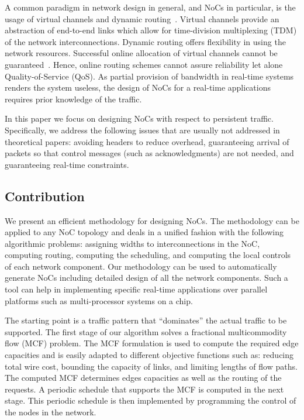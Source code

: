 \documentclass[a4paper,12pt]{article}
\newenvironment{proof sketch}[1]{\noindent {\emph{Proof sketch of #1:}}}{\hfill \qed}
\begin{document}
A common paradigm in network design in general, and NoCs in particular, is the usage
of virtual channels and dynamic routing~\cite{goossens2010aethereal}.  Virtual
channels provide an abstraction of end-to-end links which allow for time-division
multiplexing (TDM) of the network interconnections. Dynamic routing offers
flexibility in using the network resources.  Successful online allocation of virtual
channels cannot be guaranteed~\cite{awerbuch1993throughput,aspnes1997line}.  Hence,
online routing schemes cannot assure reliability let alone Quality-of-Service (QoS).
As partial provision of bandwidth in real-time systems renders the system useless,
the design of NoCs for a real-time applications requires prior knowledge of the traffic.

In this paper we focus on designing NoCs with respect to persistent traffic.
Specifically, we address the following issues that are usually not addressed in
theoretical papers: avoiding headers to reduce overhead, guaranteeing arrival of
packets so that control messages (such as acknowledgments) are not needed, and
guaranteeing real-time constraints.

\subsection{Contribution}
We present an efficient methodology for designing NoCs.  The methodology can be
applied to any NoC topology and deals in a unified fashion with the following
algorithmic problems: assigning widths to interconnections in the NoC, computing
routing, computing the scheduling, and computing the local controls of each network
component.  Our methodology can be used to automatically generate NoCs including
detailed design of all the network components. Such a tool can help in 
implementing  specific real-time applications over parallel platforms such as
multi-processor systems on a chip.

The starting point is a traffic pattern that ``dominates'' the actual traffic to be
supported.  The first stage of our algorithm solves a fractional multicommodity flow
(MCF) problem.  The MCF formulation is used to compute the required edge capacities
and is easily adapted to different objective functions such as: reducing total wire
cost, bounding the capacity of links, and limiting lengths of flow paths.  The
computed MCF determines edges capacities as well as the routing of the requests.  A
periodic schedule that supports the MCF is computed in the next stage.  This periodic
schedule is then implemented by programming the control of the nodes in the network.
\end{document}
